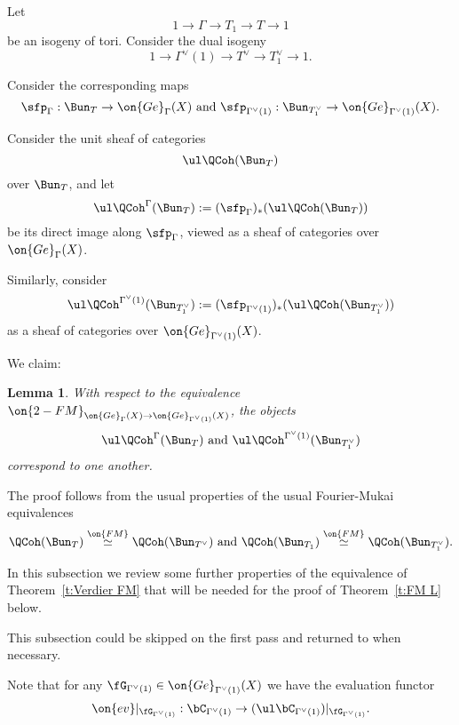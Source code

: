 \documentclass[9pt]{amsart}
\newtheorem{lem}[subsubsection]{Lemma}
\theoremstyle{remark}
\theoremstyle{definition}
\theoremstyle{remark}
\newcommand{\thmref}[1]{Theorem~\ref{#1}}
\numberwithin{equation}{section}
\begin{document}

\sssec{}

Let 
$$1\to \Gamma\to T_1\to T\to 1$$
be an isogeny of tori. Consider the dual isogeny 
$$1\to \Gamma^\vee(1)\to T^\vee\to T^\vee_1\to 1.$$

Consider the corresponding maps
$$\sfp_{\Gamma}:\Bun_T\to \on{Ge}_{\Gamma}(X) \text{ and }
\sfp_{\Gamma^\vee(1)}:\Bun_{T^\vee_1}\to \on{Ge}_{\Gamma^\vee(1)}(X).$$

\sssec{}

Consider the unit sheaf of categories 
$$\ul\QCoh(\Bun_T)$$ 
over $\Bun_T$, and let
$$\ul\QCoh^\Gamma(\Bun_T):=(\sfp_{\Gamma})_*(\ul\QCoh(\Bun_T))$$
be its direct image along $\sfp_{\Gamma}$, viewed as a sheaf of categories over $\on{Ge}_{\Gamma}(X)$.

\medskip 

Similarly, consider
$$\ul\QCoh^{\Gamma^\vee(1)}(\Bun_{T^\vee_1}):=(\sfp_{\Gamma^\vee(1)})_*(\ul\QCoh(\Bun_{T^\vee_1}))$$
as a sheaf of categories over $\on{Ge}_{\Gamma^\vee(1)}(X)$.

\sssec{}

We claim: 

\begin{lem}
With respect to the equivalence $\on{2-FM}_{\on{Ge}_{\Gamma}(X)\to \on{Ge}_{\Gamma^\vee(1)}(X)}$, the objects
$$\ul\QCoh^\Gamma(\Bun_T) \text{ and } \ul\QCoh^{\Gamma^\vee(1)}(\Bun_{T^\vee_1})$$
correspond to one another.
\end{lem}

The proof follows from the usual properties of the usual Fourier-Mukai equivalences
$$\QCoh(\Bun_T)\overset{\on{FM}}\simeq \QCoh(\Bun_{T^\vee})  \text{ and }
\QCoh(\Bun_{T_1})\overset{\on{FM}}\simeq \QCoh(\Bun_{T_1^\vee}).$$



In this subsection we review some further properties of the equivalence of \thmref{t:Verdier FM} that will be needed for the proof
of \thmref{t:FM L} below. 

\medskip

This subsection could be skipped on the first pass and returned to
when necessary.

\sssec{}

Note that for any $\fG_{\Gamma^\vee(1)}\in \on{Ge}_{\Gamma^\vee(1)}(X)$ we have the evaluation functor
$$\on{ev}|_{\fG_{\Gamma^\vee(1)}}:\bC_{\Gamma^\vee(1)}\to (\ul\bC_{\Gamma^\vee(1)})|_{\fG_{\Gamma^\vee(1)}}.$$
\end{document}
